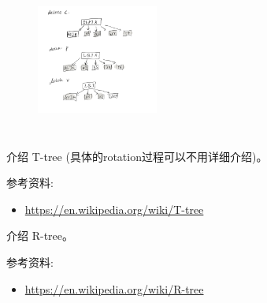 \documentclass[a4paper, justified]{tufte-handout}
\begin{document}
\begin{problem}[TC 18.3-1]
\end{problem}

\begin{solution}
  \begin{figure}
    \centering
    \includegraphics[width=4cm,height=5cm]{pic.jpg}
  \end{figure}
\end{solution}

\beginoptional

\begin{problem}
\end{problem}

\begin{solution}
\end{solution}

\beginot

\begin{ot}[T-tree]
  介绍 T-tree (具体的rotation过程可以不用详细介绍)。

  \noindent 参考资料:
  \begin{itemize}
    \item \href{https://en.wikipedia.org/wiki/T-tree}{https://en.wikipedia.org/wiki/T-tree}
  \end{itemize}
\end{ot}


\begin{ot}[R-tree]
  介绍 R-tree。

  \noindent 参考资料:
  \begin{itemize}
    \item \href{https://en.wikipedia.org/wiki/R-tree}{https://en.wikipedia.org/wiki/R-tree}
  \end{itemize}
\end{ot}
% 
\end{document}
